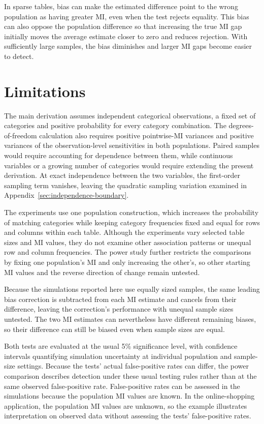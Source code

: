 In sparse tables, bias can make the estimated difference point to the wrong
population as having greater MI, even when the test rejects equality.
This bias can also oppose the population difference so that increasing the true
MI gap initially moves the average estimate closer to zero and reduces
rejection. With sufficiently large samples, the bias diminishes and larger
MI gaps become easier to detect.

\section{Limitations}

The main derivation assumes independent categorical observations, a fixed
set of categories and positive probability for every category combination.
The degrees-of-freedom calculation also requires positive pointwise-MI variances
and positive variances of the observation-level sensitivities in both populations.
Paired samples would require accounting for dependence between
them, while continuous variables or a growing number of categories would
require extending the present derivation. At exact independence between
the two variables, the first-order sampling term vanishes, leaving the
quadratic sampling variation examined in
Appendix~\ref{sec:independence-boundary}.

The experiments use one population construction, which increases the
probability of matching categories while keeping category frequencies fixed
and equal for rows and columns within each table. Although the experiments
vary selected table sizes and MI values, they do not examine other
association patterns or unequal row and column frequencies. The power study
further restricts the comparisons by fixing one population's MI and only
increasing the other's, so other starting MI values and the reverse
direction of change remain untested.

Because the simulations reported here use equally sized samples, the same
leading bias correction is subtracted from each MI estimate and cancels from their
difference, leaving the correction's performance with unequal sample sizes
untested. The two MI estimates can nevertheless have different remaining
biases, so their difference can still be biased even when sample sizes are
equal.

Both tests are evaluated at the usual 5\% significance level, with
confidence intervals quantifying simulation uncertainty at individual
population and sample-size settings. Because the tests' actual
false-positive rates can differ, the power comparison describes detection
under these usual testing rules rather than at the same observed
false-positive rate. False-positive rates can be assessed in the simulations
because the population MI values are known. In the online-shopping application,
the population MI values are unknown, so the example illustrates interpretation
on observed data without assessing the tests' false-positive rates.

